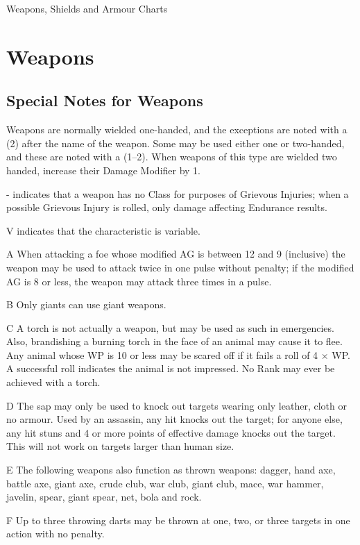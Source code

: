 \begin{Tables}{Weapons, Shields and Armour Charts}

\section{Weapons}

\subsection{Special Notes for Weapons}

 

Weapons  are  normally  wielded  one-handed,  and 
the  exceptions are  noted  with  a  (2)  after  the  name 
of  the  weapon.  Some  may  be  used  either  one  or 
two-handed,  and  these  are  noted  with  a  (1–2). 
When  weapons  of  this  type  are  wielded  two 
handed, increase their Damage Modifier by 1. 

- indicates that a weapon has no Class for purposes of Grievous
Injuries; when a possible Grievous Injury is rolled, only damage
affecting Endurance results.

V indicates that the characteristic is variable. 

A When attacking a foe whose modified AG is between 12 and 9
(inclusive) the weapon may be used to attack twice in one pulse
without penalty; if the modified AG is 8 or less, the weapon may
attack three times in a pulse.

B Only giants can use giant weapons. 

C A torch is not actually a weapon, but may be used as such in
emergencies.  Also, brandishing a burning torch in the face of an
animal may cause it to flee. Any animal whose WP is 10 or less may be
scared off if it fails a roll of 4 × WP.  A successful roll indicates
the animal is not impressed. No Rank may ever be achieved with a
torch.

D The sap may only be used to knock out targets wearing only leather,
cloth or no armour. Used by an assassin, any hit knocks out the
target; for anyone else, any hit stuns and 4 or more points of
effective damage knocks out the target.  This will not work on targets
larger than human size.

E The following weapons also function as thrown weapons: dagger, hand
axe, battle axe, giant axe, crude club, war club, giant club, mace,
war hammer, javelin, spear, giant spear, net, bola and rock.

F Up to three throwing darts may be thrown at one, 
two, or three targets in one action with no penalty. 


\end{Tables}
